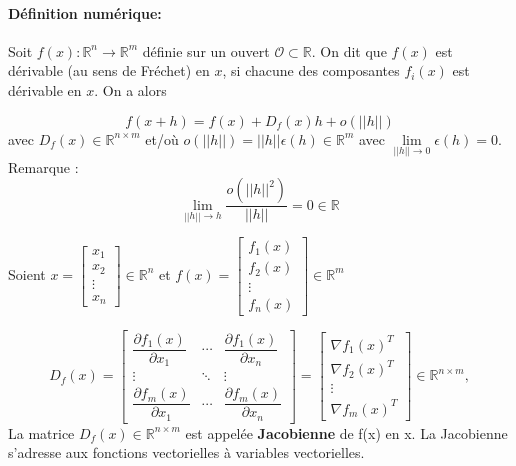 	\paragraph*{Définition numérique:}
	
	Soit $f(x) : \mathbb{R}^n \to \mathbb{R}^m$ définie sur un ouvert $ \mathcal{O} \subset \mathbb{R} $. On dit que $f(x)$ est dérivable
	(au sens de Fréchet) en $x$, si chacune des composantes $f_i(x)$ est dérivable  en $x$. On a alors
	
	\begin{equation}
		f(x + h) = f(x) + D_f (x)h + o(||h||)
	\end{equation}
	avec $D_f (x) \in  \mathbb{R}^{n \times m} $ et/où $ o(||h||)=||h|| \epsilon(h) \in \mathbb{R}^m $ avec $\lim\limits_{||h|| \to 0} \epsilon(h) = 0 $.
	Remarque :
	$$
		\lim\limits_{||h|| \to h} \frac{o(||h||^2)}{||h||} = 0  \in \mathbb{R}
	$$
	
	Soient 
	$x = 
		\begin{bmatrix}
			x_1 \\ x_2\\ \vdots \\ x_n
		\end{bmatrix}
		\in \mathbb{R}^n $ et $ 
	f(x) = 
		\begin{bmatrix}
			f_1(x) \\ f_2(x)\\ \vdots \\ f_n(x)
		\end{bmatrix} \in \mathbb{R}^m
	$
	
	$$
	D_f\left(x\right)={
		\begin{bmatrix}
		{\dfrac {\partial f_{1}(x)}{\partial x_{1}}}&\cdots &{\dfrac {\partial f_{1}(x)}{\partial x_{n}}}\\
		\vdots &\ddots &\vdots \\
		{\dfrac {\partial f_{m}(x)}{\partial x_{1}}}&\cdots &{\dfrac {\partial f_{m}(x)}{\partial x_{n}}}
		\end{bmatrix}}
		=
		\begin{bmatrix}
		\nabla f_1(x)^T \\ \nabla f_2(x)^T\\ \vdots \\ \nabla f_m(x)^T
		\end{bmatrix}
		\in  \mathbb{R}^{n \times m},
	$$
	La matrice $D_f (x) \in  \mathbb{R}^{n \times m} $ est appelée \textbf{Jacobienne} de f(x) en x.
	La Jacobienne s’adresse aux fonctions vectorielles à variables vectorielles.
	
